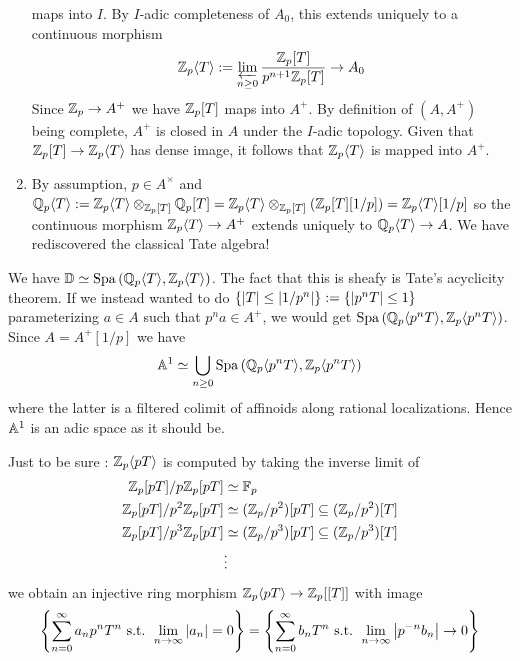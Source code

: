 \documentclass{article}
\begin{document}
\begin{eg}
\begin{enumerate}
    maps into $I$.
    By $I$-adic completeness of $A_0$,
    this extends uniquely to a continuous morphism \[
      \mathbb{Z}_p\langle T \rangle := \varprojlim_{n \geq 0} \frac{\mathbb{Z}_p[T]}{p^{n+1} \mathbb{Z}_p[T]} \to A_0
    \]
    Since $\mathbb{Z}_p \to A^+$ we have $\mathbb{Z}_p[T]$ maps into $A^+$.
    By definition of $(A , A^+)$ being complete,
    $A^+$ is closed in $A$ under the $I$-adic topology.
    Given that $\mathbb{Z}_p[T] \to \mathbb{Z}_p\langle T\rangle$ has dense image,
    it follows that $\mathbb{Z}_p\langle T \rangle$ is mapped into $A^+$.
    \item By assumption, $p \in A^\times$ 
     and $\mathbb{Q}_p\langle T\rangle := \mathbb{Z}_p\langle T \rangle \otimes_{\mathbb{Z}_p[T]} \mathbb{Q}_p[T]
    = \mathbb{Z}_p\langle T\rangle \otimes_{\mathbb{Z}_p[T]} \left(\mathbb{Z}_p[T][1 / p]\right)
    = \mathbb{Z}_p\langle T\rangle[1/p]$ so
    the continuous morphism $\mathbb{Z}_p\langle T \rangle \to A^+$ extends
    uniquely to $\mathbb{Q}_p\langle T \rangle \to A$.
    We have rediscovered the classical Tate algebra!
    \end{enumerate}
  We have $\mathbb{D} \simeq \mathrm{Spa}\,(\mathbb{Q}_p\langle T\rangle , \mathbb{Z}_p\langle T\rangle)$.
  The fact that this is sheafy is 
  Tate's acyclicity theorem.
  \cite[Theorem 3.1.8.(3)]{SW20}
  If we instead wanted to do $\left\{\left\vert T \right\vert \leq \left\vert 1 / p^n \right\vert\right\} := 
  \left\{\left\vert p^n T \right\vert \leq 1\right\}$
  parameterizing $a \in A$ such that $p^n a \in A^+$,
  we would get $\mathrm{Spa}\,(\mathbb{Q}_p\langle p^n T\rangle , \mathbb{Z}_p\langle p^n T\rangle)$.
  Since $A = A^+[1 / p]$ we have 
  \[
    \mathbb{A}^1 \simeq \bigcup_{n \geq 0} \mathrm{Spa}\,(\mathbb{Q}_p\langle p^nT\rangle , \mathbb{Z}_p\langle p^n T\rangle)
  \]
  where the latter is a filtered colimit of affinoids
  along rational localizations.
  Hence $\mathbb{A}^1$ is an adic space as it should be.

  Just to be sure : $\mathbb{Z}_p\langle p T \rangle$ is computed by taking the inverse limit of
  \begin{align*}
    \mathbb{Z}_p[p T] / p \mathbb{Z}_p[p T] &\simeq \mathbb{F}_p \\
    \mathbb{Z}_p[p T] / p^2 \mathbb{Z}_p [pT] &\simeq 
      (\mathbb{Z}_p / p^2)[p T] \subseteq (\mathbb{Z}_p / p^2)[T]\\
    \mathbb{Z}_p[pT] / p^3 \mathbb{Z}_p [pT] &\simeq 
      (\mathbb{Z}_p / p^3)[p T] \subseteq (\mathbb{Z}_p / p^3)[T]\\
    &\vdots
  \end{align*}
  we obtain an injective ring morphism $\mathbb{Z}_p\langle pT \rangle \to \mathbb{Z}_p[[T]]$
  with image \[
    \left\{\sum_{n = 0}^\infty a_n p^n T^n \text{ s.t. } \lim_{n \to \infty} \left\vert a_n \right\vert = 0\right\}
    = \left\{\sum_{n = 0}^\infty b_n T^n \text{ s.t. } 
    \lim_{n \to \infty} \left\vert p^{-n} b_n \right\vert \to 0\right\}
  \]
\end{eg}
\end{document}
